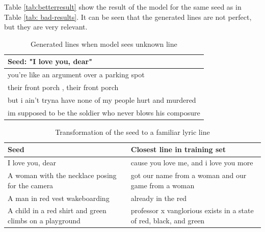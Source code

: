 \documentclass{article}
\begin{document}
Table \ref{tab:betterresult} show the result of the model for the same seed as in Table \ref{tab: bad-results}. It can be seen that the generated lines are not perfect, but they are very relevant.

\begin{table}[]
\centering
\begin{tabular}{l}
\hline
Seed: "I love you, dear"                                    \\ \hline
you’re like an argument over a parking spot                 \\
their front porch , their front porch                       \\
but i ain’t tryna have none of my people hurt and murdered  \\
im supposed to be the soldier who never blows his composure \\ \hline
\end{tabular}
\caption{Generated lines when model sees unknown line}
\label{badresults}

\end{table}

\begin{table}[]
\centering
\label{table-transform}
\begin{tabular}{|l|l|}
\hline
\textbf{Seed}                                           & \textbf{Closest line in training set}                              \\ \hline
I love you, dear                                        & cause you love me, and i love you more                             \\ \hline
A woman with the necklace posing for the camera         & got our name from a woman and our game from a woman                \\ \hline
A man in red vest wakeboarding                          & already in the red                                                 \\ \hline
A child in a red shirt and green climbs on a playground & professor x vanglorious exists in a state of red, black, and green \\ \hline
\end{tabular}
\caption{Transformation of the seed to a familiar lyric line}
\end{table}
\end{document}
